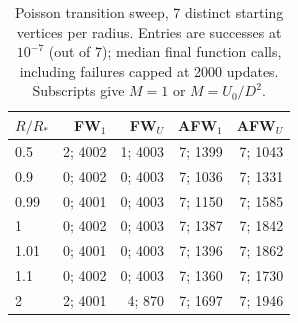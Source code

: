 \begin{table}[htbp]
\centering\small
\caption{Poisson transition sweep, 7 distinct starting vertices per radius. Entries are successes at $10^{-7}$ (out of 7); median final function calls, including failures capped at 2000 updates. Subscripts give $M=1$ or $M=U_0/D^2$.}
\label{tab:transition}
\begin{tabular}{lrrrr}
\hline
$R/R_*$ & FW$_1$ & FW$_U$ & AFW$_1$ & AFW$_U$ \\
\hline
0.5 & 2; 4002 & 1; 4003 & 7; 1399 & 7; 1043 \\
0.9 & 0; 4002 & 0; 4003 & 7; 1036 & 7; 1331 \\
0.99 & 0; 4001 & 0; 4003 & 7; 1150 & 7; 1585 \\
1 & 0; 4002 & 0; 4003 & 7; 1387 & 7; 1842 \\
1.01 & 0; 4001 & 0; 4003 & 7; 1396 & 7; 1862 \\
1.1 & 0; 4002 & 0; 4003 & 7; 1360 & 7; 1730 \\
2 & 2; 4001 & 4; 870 & 7; 1697 & 7; 1946 \\
\hline
\end{tabular}
\end{table}
